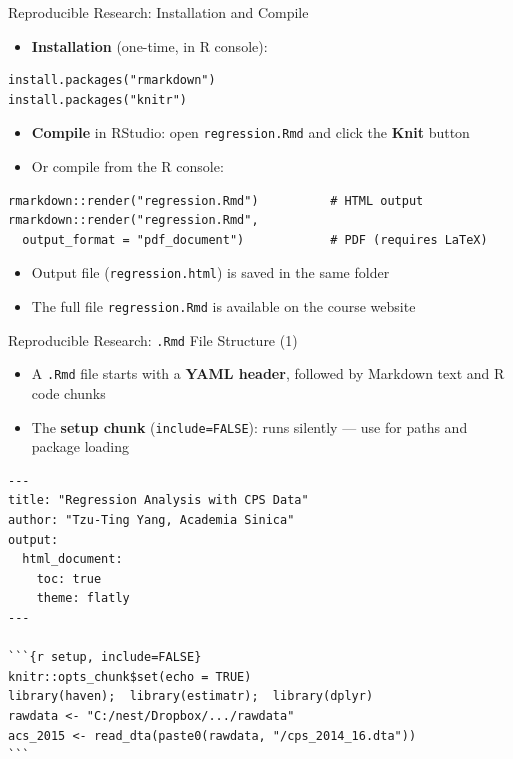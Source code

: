 \documentclass[dvipsnames,hyperref={pdfpagelabels=false}]{beamer}
\begin{document}
\begin{frame}[fragile]{Reproducible Research: Installation and Compile}

	\begin{itemize}
		\item \textbf{Installation} (one-time, in R console):
	\end{itemize}

\begin{lstlisting}
install.packages("rmarkdown")
install.packages("knitr")
\end{lstlisting}

	\begin{itemize}
		\item \textbf{Compile} in RStudio: open \texttt{regression.Rmd} and click the \textbf{Knit} button
		\vspace{0.2cm}
		\item Or compile from the R console:
	\end{itemize}

\begin{lstlisting}
rmarkdown::render("regression.Rmd")          # HTML output
rmarkdown::render("regression.Rmd",
  output_format = "pdf_document")            # PDF (requires LaTeX)
\end{lstlisting}

	\begin{itemize}
		\item Output file (\texttt{regression.html}) is saved in the same folder
		\vspace{0.2cm}
		\item The full file \texttt{regression.Rmd} is available on the course website
	\end{itemize}

\end{frame}



\begin{frame}[fragile]{Reproducible Research: \texttt{.Rmd} File Structure (1)}

	\begin{itemize}
		\item A \texttt{.Rmd} file starts with a \textbf{YAML header}, followed by Markdown text and R code chunks
		\vspace{0.2cm}
		\item The \textbf{setup chunk} (\texttt{include=FALSE}): runs silently --- use for paths and package loading
	\end{itemize}

\begin{lstlisting}[language={},basicstyle=\ttfamily\fontsize{7.5}{9}\selectfont,keywordstyle={}]
---
title: "Regression Analysis with CPS Data"
author: "Tzu-Ting Yang, Academia Sinica"
output:
  html_document:
    toc: true
    theme: flatly
---

```{r setup, include=FALSE}
knitr::opts_chunk$set(echo = TRUE)
library(haven);  library(estimatr);  library(dplyr)
rawdata <- "C:/nest/Dropbox/.../rawdata"
acs_2015 <- read_dta(paste0(rawdata, "/cps_2014_16.dta"))
```
\end{lstlisting}

\end{frame}
\end{document}
